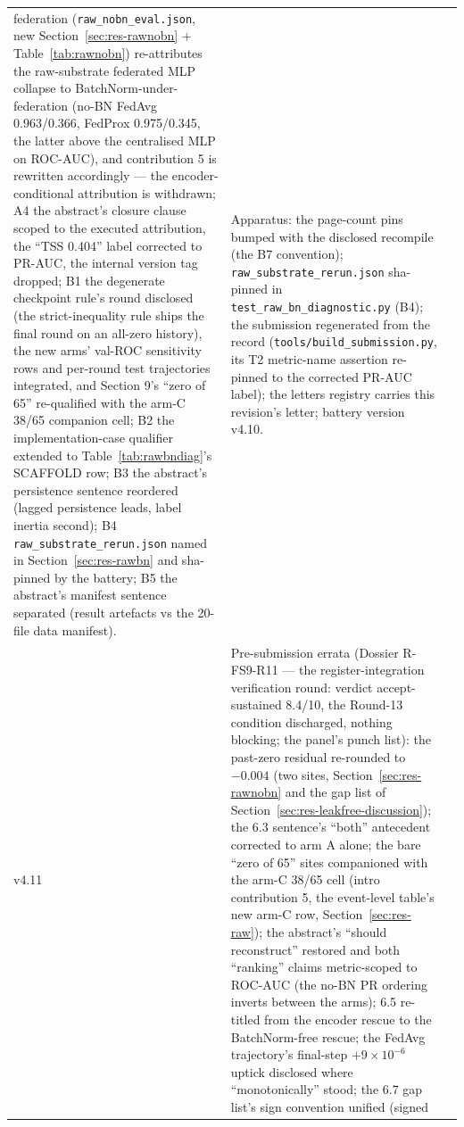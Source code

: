 \begin{longtable}{@{}p{} >{\raggedright\arraybackslash}p{} >{\raggedright\arraybackslash}p{}@{}}
federation (\texttt{raw\_nobn\_eval.json}, new
Section~\ref{sec:res-rawnobn} + Table~\ref{tab:rawnobn}) re-attributes
the raw-substrate federated MLP collapse to
BatchNorm-under-federation (no-BN FedAvg 0.963/0.366, FedProx
0.975/0.345, the latter above the centralised MLP on ROC-AUC), and
contribution 5 is rewritten accordingly — the encoder-conditional
attribution is withdrawn; A4 the abstract's closure clause scoped to
the executed attribution, the ``TSS 0.404'' label corrected to
PR-AUC, the internal version tag dropped; B1 the degenerate
checkpoint rule's round disclosed (the strict-inequality rule ships
the final round on an all-zero history), the new arms'
val-ROC sensitivity rows and per-round test trajectories
integrated, and Section 9's ``zero of 65'' re-qualified with the
arm-C 38/65 companion cell; B2 the implementation-case qualifier
extended to Table~\ref{tab:rawbndiag}'s SCAFFOLD row; B3 the
abstract's persistence sentence reordered (lagged persistence leads,
label inertia second); B4 \texttt{raw\_substrate\_rerun.json} named
in Section~\ref{sec:res-rawbn} and sha-pinned by the battery; B5 the
abstract's manifest sentence separated (result artefacts vs the
20-file data manifest). & Apparatus: the page-count pins bumped with
the disclosed recompile (the B7 convention);
\texttt{raw\_substrate\_rerun.json} sha-pinned in
\texttt{test\_raw\_bn\_diagnostic.py} (B4); the submission
regenerated from the record (\texttt{tools/build\_submission.py},
its T2 metric-name assertion re-pinned to the corrected PR-AUC
label); the letters registry carries this revision's letter; battery
version v4.10. \\
v4.11 & Pre-submission errata (Dossier R-FS9-R11 — the
register-integration verification round: verdict accept-sustained
8.4/10, the Round-13 condition discharged, nothing blocking; the
panel's punch list): the past-zero residual re-rounded to
$-0.004$ (two sites, Section~\ref{sec:res-rawnobn} and the
gap list of Section~\ref{sec:res-leakfree-discussion}); the 6.3
sentence's ``both'' antecedent corrected to arm A alone; the bare
``zero of 65'' sites companioned with the arm-C 38/65 cell (intro
contribution 5, the event-level table's new arm-C row,
Section~\ref{sec:res-raw}); the abstract's ``should reconstruct''
restored and both ``ranking'' claims metric-scoped to ROC-AUC (the
no-BN PR ordering inverts between the arms); 6.5 re-titled from the
encoder rescue to the BatchNorm-free rescue; the FedAvg trajectory's
final-step $+9\times10^{-6}$ uptick disclosed where ``monotonically''
stood; the 6.7 gap list's sign convention unified (signed

\end{longtable}
